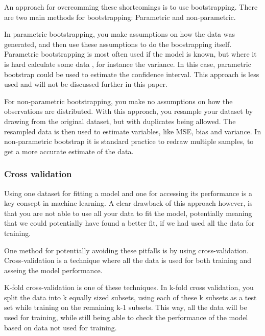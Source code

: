 \documentclass[12pt]{article}
\begin{document}
An approach for overcomming these shortcomings is to use bootstrapping. There are two main methods for bootstrapping: Parametric and non-parametric.

In parametric bootstrapping, you make assumptions on how the data was generated, and then use these assumptions to do the boostrapping itself.
Parametric bootstrapping is most often used if the model is known, but where it is hard calculate some data %
, for instance the variance.
In this case, parametric bootstrap could be used to estimate the confidence interval.
This approach is less used and will not be discussed further in this paper. %

For non-parametric bootstrapping, you make no assumptions on how the observations are distributed.
With this approach, you resample your dataset by drawing from the original dataset, but with duplicates being allowed.
The resampled data is then used to estimate variables, like MSE, bias and variance.
In non-parametric bootstrap it is standard practice to redraw multiple samples, to get a more accurate estimate of the data.



\subsubsection{Cross validation}

Using one dataset for fitting a model and one for accessing its performance is a key consept in machine learning.
A clear drawback of this approach however, is that you are not able to use all your data to fit the model, potentially meaning that we could potentially have found a better fit, if we had used all the data for training.

One method for potentially avoiding these pitfalls is by using cross-validation. Cross-validation is a technique where all the data is used for both training and asseing the model performance.

K-fold cross-validation is one of these techniques.
In k-fold cross validation, you split the data into k equally sized subsets, using each of these k subsets as a test set while training on the remaining k-1 subsets.
This way, all the data will be used for training, while still being able to check the performance of the model based on data not used for training.
\end{document}
